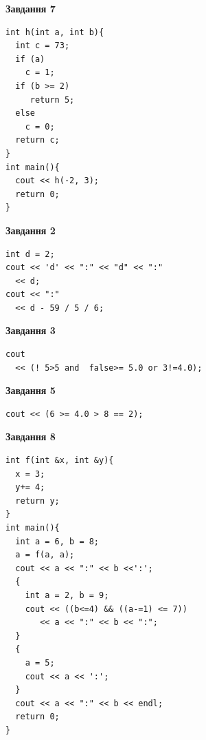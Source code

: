 \documentclass[12pt, ukrainian]{article}
\begin{document}
{\begin {large}
\begin{minipage}[t]{7.0cm}
\begin{center}
\textbf{Завдання 7}
\end{center}
\vspace{-8mm}

\begin{verbatim}
int h(int a, int b){
  int c = 73;
  if (a)
    c = 1;
  if (b >= 2)
     return 5;
  else
    c = 0;
  return c;
}
int main(){
  cout << h(-2, 3);
  return 0;
}
\end{verbatim}

\end{minipage}
\vline \hspace{1mm}
\begin{minipage}[t]{11.0cm}

\begin{center}
\textbf{Завдання 2}
\end{center}
\vspace{-8mm}

\begin{verbatim}
int d = 2;
cout << 'd' << ":" << "d" << ":" 
  << d;
cout << ":" 
  << d - 59 / 5 / 6;
\end{verbatim}



\begin{center}
\textbf{Завдання 3}
\end{center}
\vspace{-8mm}

\begin{verbatim}
cout 
  << (! 5>5 and  false>= 5.0 or 3!=4.0);
\end{verbatim}



\begin{center}
\textbf{Завдання 5}
\end{center}
\vspace{-8mm}

\begin{verbatim}
cout << (6 >= 4.0 > 8 == 2);
\end{verbatim}



\begin{center}
\textbf{Завдання 8}
\end{center}
\vspace{-8mm}

\begin{verbatim}
int f(int &x, int &y){
  x = 3;
  y+= 4;
  return y;
}
int main(){
  int a = 6, b = 8;
  a = f(a, a);
  cout << a << ":" << b <<':';
  {
    int a = 2, b = 9;
    cout << ((b<=4) && ((a-=1) <= 7))
       << a << ":" << b << ":";
  }
  {
    a = 5;
    cout << a << ':';
  }
  cout << a << ":" << b << endl;
  return 0;
}
\end{verbatim}


\end{minipage}
\end{large}}
\end{document}
